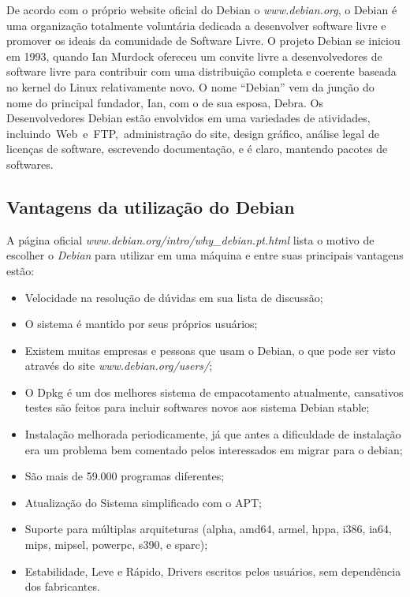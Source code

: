 De acordo com o próprio website oficial do Debian o \textit{www.debian.org}, o Debian é uma organização totalmente voluntária dedicada a desenvolver software livre e promover os ideais da comunidade de Software Livre. O projeto Debian se iniciou em 1993, quando Ian Murdock ofereceu um convite livre a desenvolvedores de software livre para contribuir com uma distribuição completa e coerente baseada no kernel do Linux relativamente novo. O nome “Debian” vem da junção do nome do principal fundador, Ian, com o de sua esposa, Debra. Os Desenvolvedores Debian estão envolvidos em uma variedades de atividades, incluindo Web e FTP, administração do site, design gráfico, análise legal de licenças de software, escrevendo documentação, e é claro, mantendo pacotes de softwares.

\subsection{Vantagens da utilização do Debian}
A página oficial \textit{www.debian.org/intro/why\_debian.pt.html} lista o motivo de escolher o \textit{Debian} para utilizar em uma máquina e entre suas principais vantagens estão:

\begin{itemize}
	\item Velocidade na resolução de dúvidas em sua lista de discussão;
	\item O sistema é mantido por seus próprios usuários;
	\item Existem muitas empresas e pessoas que usam o Debian, o que pode ser visto através do site \textit{www.debian.org/users/};
	\item O Dpkg é um dos melhores sistema de empacotamento atualmente, cansativos testes são feitos para incluir softwares novos aos sistema Debian stable;
	\item Instalação melhorada periodicamente, já que antes a dificuldade de instalação era um problema bem comentado pelos interessados em migrar para o debian;
	\item São mais de 59.000 programas diferentes;
	\item Atualização do Sistema simplificado com o APT;
	\item Suporte para múltiplas arquiteturas (alpha, amd64, armel, hppa, i386, ia64, mips, mipsel, powerpc, s390, e sparc);
	\item Estabilidade, Leve e Rápido, Drivers escritos pelos usuários, sem dependência dos fabricantes.
\end{itemize}

